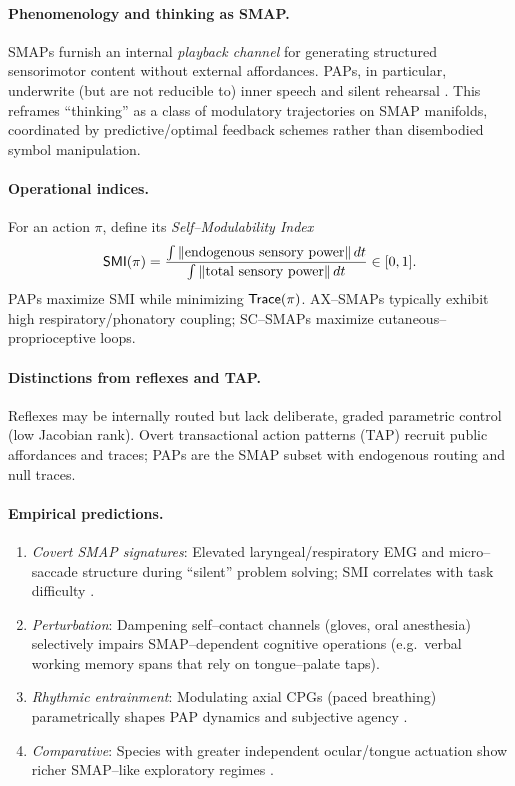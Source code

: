 \paragraph{Phenomenology and thinking as SMAP.}
SMAPs furnish an internal \emph{playback channel} for generating structured sensorimotor content without external affordances. PAPs, in particular, underwrite (but are not reducible to) inner speech and silent rehearsal \citep{AldersonDayFernyhough2015InnerSpeech,Guenther2016NeuralControlSpeech}. This reframes “thinking” as a class of modulatory trajectories on SMAP manifolds, coordinated by predictive/optimal feedback schemes \citep{TodorovJordan2002OFC,Friston2010FEP,Seth2013InteroceptiveInference} rather than disembodied symbol manipulation.

\paragraph{Operational indices.}
For an action $\pi$, define its \emph{Self–Modulability Index}
\[
\mathsf{SMI}(\pi)=\frac{\int \|\text{endogenous sensory power}\|\,dt}{\int \|\text{total sensory power}\|\,dt}\in[0,1].
\]
PAPs maximize SMI while minimizing $\mathsf{Trace}(\pi)$. AX–SMAPs typically exhibit high respiratory/phonatory coupling; SC–SMAPs maximize cutaneous–proprioceptive loops.

\paragraph{Distinctions from reflexes and TAP.}
Reflexes may be internally routed but lack deliberate, graded parametric control (low Jacobian rank). Overt transactional action patterns (TAP) recruit public affordances and traces; PAPs are the SMAP subset with endogenous routing and null traces.

\paragraph{Empirical predictions.}
\begin{enumerate}
  \item \emph{Covert SMAP signatures}: Elevated laryngeal/respiratory EMG and micro–saccade structure during “silent” problem solving; SMI correlates with task difficulty \citep{AldersonDayFernyhough2015InnerSpeech,Guenther2016NeuralControlSpeech}.
  \item \emph{Perturbation}: Dampening self–contact channels (gloves, oral anesthesia) selectively impairs SMAP–dependent cognitive operations (e.g.\ verbal working memory spans that rely on tongue–palate taps).
  \item \emph{Rhythmic entrainment}: Modulating axial CPGs (paced breathing) parametrically shapes PAP dynamics and subjective agency \citep{DelNegro2018BreathingMatters,Haggard2017AgencyReview}.
  \item \emph{Comparative}: Species with greater independent ocular/tongue actuation show richer SMAP–like exploratory regimes \citep{LandNilsson2012AnimalEyes,Schwenk1994ForkedTongues}.
\end{enumerate}

